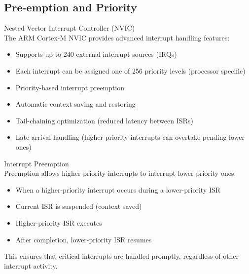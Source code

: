 \subsection{Pre-emption and Priority}

\begin{concept}{Nested Vector Interrupt Controller (NVIC)}\\
The ARM Cortex-M NVIC provides advanced interrupt handling features:
\begin{itemize}
    \item Supports up to 240 external interrupt sources (IRQs)
    \item Each interrupt can be assigned one of 256 priority levels (processor specific)
    \item Priority-based interrupt preemption
    \item Automatic context saving and restoring
    \item Tail-chaining optimization (reduced latency between ISRs)
    \item Late-arrival handling (higher priority interrupts can overtake pending lower ones)
\end{itemize}
\end{concept}

\begin{definition}{Interrupt Preemption}\\
Preemption allows higher-priority interrupts to interrupt lower-priority ones:
\begin{itemize}
    \item When a higher-priority interrupt occurs during a lower-priority ISR
    \item Current ISR is suspended (context saved)
    \item Higher-priority ISR executes
    \item After completion, lower-priority ISR resumes
\end{itemize}
This ensures that critical interrupts are handled promptly, regardless of other interrupt activity.
\end{definition}

